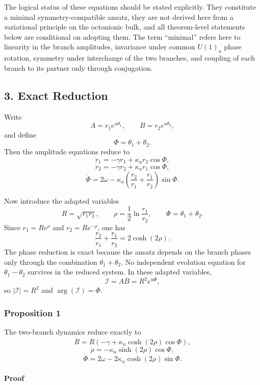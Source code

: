 \documentclass[
]{article}
\begin{document}
The logical status of these equations should be stated explicitly. They
constitute a minimal symmetry-compatible ansatz, they are not derived
here from a variational principle on the octonionic bulk, and all
theorem-level statements below are conditional on adopting them. The
term ``minimal'' refers here to linearity in the branch amplitudes,
invariance under common \(U(1)_u\) phase rotation, symmetry under
interchange of the two branches, and coupling of each branch to its
partner only through conjugation.

\subsection{3. Exact Reduction}\label{exact-reduction}

Write \[
A = r_1 e^{u\theta_1}, \qquad B = r_2 e^{u\theta_2},
\] and define \[
\Phi = \theta_1 + \theta_2.
\] Then the amplitude equations reduce to \[
\dot{r}_1 = -\gamma r_1 + \kappa_{u} r_2 \cos\Phi,
\] \[
\dot{r}_2 = -\gamma r_2 + \kappa_{u} r_1 \cos\Phi,
\] \[
\dot{\Phi} = 2\omega - \kappa_{u}\left(\frac{r_2}{r_1} + \frac{r_1}{r_2}\right)\sin\Phi.
\]

Now introduce the adapted variables \[
R = \sqrt{r_1 r_2}, \qquad
\rho = \frac{1}{2}\ln\frac{r_1}{r_2}, \qquad
\Phi = \theta_1 + \theta_2.
\] Since \(r_1 = Re^\rho\) and \(r_2 = Re^{-\rho}\), one has \[
\frac{r_2}{r_1} + \frac{r_1}{r_2} = 2\cosh(2\rho).
\] The phase reduction is exact because the ansatz depends on the branch
phases only through the combination \(\theta_1+\theta_2\). No
independent evolution equation for \(\theta_1-\theta_2\) survives in the
reduced system. In these adapted variables, \[
\mathcal{I} = A\overline{B} = R^2 e^{u\Phi},
\] so \(|\mathcal{I}| = R^2\) and \(\arg(\mathcal{I}) = \Phi\).

\subsubsection{Proposition 1}\label{proposition-1}

The two-branch dynamics reduce exactly to \[
\dot{R} = R\left(-\gamma + \kappa_{u} \cosh(2\rho)\cos\Phi\right),
\] \[
\dot{\rho} = -\kappa_{u} \sinh(2\rho)\cos\Phi,
\] \[
\dot{\Phi} = 2\omega - 2\kappa_{u} \cosh(2\rho)\sin\Phi.
\]

\paragraph{Proof}\label{proof}
\end{document}
